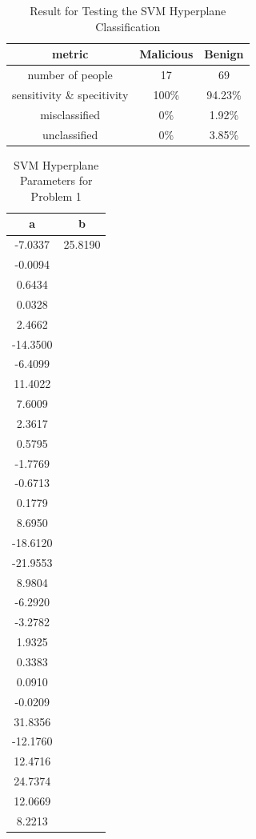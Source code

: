 \begin{table}[h]
    \centering
    \begin{tabular}{c || c | c}
         metric & Malicious & Benign  \\
         \hline
         number of people & 17 & 69 \\
         \hline
         sensitivity \& specitivity & 100\% & 94.23\% \\ 
         misclassified & 0\% & 1.92\% \\
         unclassified & 0\% & 3.85\%\\
    \end{tabular}
    \caption{Result for Testing the SVM Hyperplane Classification}
    \label{tab:svm_test}
\end{table}

\begin{table}
    \centering
    \begin{tabular}{c c}
 a & b\\
 \hline
 \hline
   -7.0337 & 25.8190\\
   -0.0094\\
    0.6434\\
    0.0328\\
    2.4662\\
  -14.3500\\
   -6.4099\\
   11.4022\\
    7.6009\\
    2.3617\\
    0.5795\\
   -1.7769\\
   -0.6713\\
    0.1779\\
    8.6950\\
  -18.6120\\
  -21.9553\\
    8.9804\\
   -6.2920\\
   -3.2782\\
    1.9325\\
    0.3383\\
    0.0910\\
   -0.0209\\
   31.8356\\
  -12.1760\\
   12.4716\\
   24.7374\\
   12.0669\\
    8.2213\\
    \end{tabular}
    \caption{SVM Hyperplane Parameters for Problem 1}
    \label{tab:svm_param}
\end{table}

